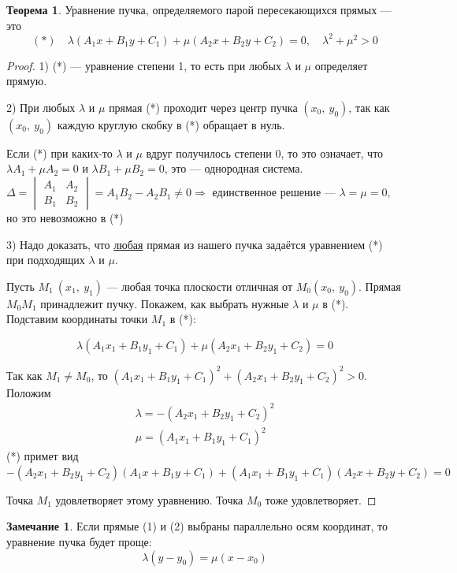\documentclass{article}
\theoremstyle{definition}
\newtheorem{theorem}{Теорема}[section]
\newtheorem{remark}{Замечание}
\begin{document}
\begin{theorem}
Уравнение пучка, определяемого парой пересекающихся прямых --- это
$$ (*)\quad \lambda\left(A_1x + B_1y + C_1\right) + \mu\left(A_2x + B_2y + C_2\right) = 0,\quad \lambda^2 + \mu^2 > 0$$

\begin{proof}
1) (*) --- уравнение степени 1, то есть при любых $\lambda$ и $\mu$ определяет прямую.

2) При любых $\lambda$ и $\mu$ прямая (*) проходит через центр пучка $(x_0,\ y_0)$, так как $(x_0,\ y_0)$ каждую круглую скобку в (*) обращает в нуль.

Если (*) при каких-то $\lambda$ и $\mu$ вдруг получилось степени $0$, то это означает, что $\lambda A_1 + \mu A_2 = 0$ и $\lambda B_1 + \mu B_2 = 0$, это --- однородная система.
$\Delta = \begin{vmatrix}
A_1 & A_2\\
B_1 & B_2
\end{vmatrix} = A_1B_2 - A_2B_1 \neq 0 \Longrightarrow $ единственное решение --- $\lambda = \mu = 0$, но это невозможно в (*)

3) Надо доказать, что \underline{любая} прямая из нашего пучка задаётся уравнением (*) при подходящих $\lambda$ и $\mu$.

Пусть $M_1\ (x_1,\ y_1)$ --- любая точка плоскости отличная от $M_0 (x_0,\ y_0)$. Прямая $M_0M_1$ принадлежит пучку. Покажем, как выбрать нужные $\lambda$ и $\mu$ в (*). Подставим координаты точки $M_1$ в (*):

$$\lambda\left(A_1x_1 + B_1y_1 + C_1\right) + \mu\left(A_2x_1 + B_2y_1 + C_2\right) = 0$$

Так как $M_1\neq M_0$, то $\left(A_1x_1 + B_1y_1 + C_1\right)^2 + \left(A_2x_1 + B_2y_1 + C_2\right)^2 > 0$. Положим 
$$\begin{matrix}
\lambda = - \left(A_2x_1 + B_2y_1 + C_2\right)^2 \\
\mu = \left(A_1x_1 + B_1y_1 + C_1\right)^2
\end{matrix}$$
(*) примет вид $-\left(A_2x_1 + B_2y_1 + C_2\right)\left(A_1x + B_1y + C_1\right)  + \left(A_1x_1 + B_1y_1 + C_1\right)\left(A_2x + B_2y + C_2\right) = 0$

Точка $M_1$ удовлетворяет этому уравнению. Точка $M_0$ тоже удовлетворяет.
\end{proof}
\end{theorem}

\begin{remark}
Если прямые (1) и (2) выбраны параллельно осям координат, то уравнение пучка будет проще:
$$\boxed{\lambda(y - y_0) = \mu(x - x_0)}$$
\end{remark}
\end{document}
